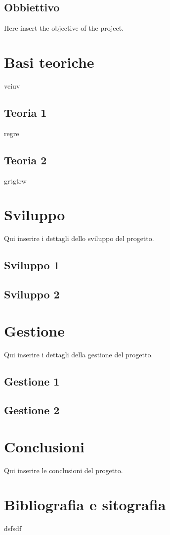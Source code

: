 \documentclass{article}
\begin{document}
\subsection{Obbiettivo}
Here insert the objective of the project.
\section{Basi teoriche}
veiuv
\subsection{Teoria 1}
regre
\subsection{Teoria 2}
grtgtrw
\section{Sviluppo}
Qui inserire i dettagli dello sviluppo del progetto.
\subsection{Sviluppo 1}
\subsection{Sviluppo 2}
\section{Gestione}
Qui inserire i dettagli della gestione del progetto.
\subsection{Gestione 1}
\subsection{Gestione 2}


\section{Conclusioni}
Qui inserire le conclusioni del progetto.
\section{Bibliografia e sitografia}
dsfsdf
\end{document}
